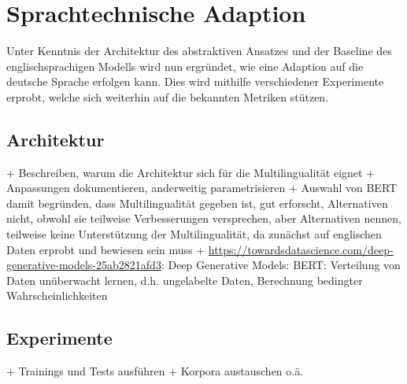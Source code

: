 \chapter{Sprachtechnische Adaption}
\thispagestyle{fancy}
\label{chap:Sprachtechnische Adaption}

\noindent
Unter Kenntnis der Architektur des abstraktiven Ansatzes und der Baseline des englischsprachigen Modells wird nun ergründet, wie eine Adaption auf die deutsche Sprache erfolgen kann. Dies wird mithilfe verschiedener Experimente erprobt, welche sich weiterhin auf die bekannten Metriken stützen.\\


\section{Architektur}
\noindent
+ Beschreiben, warum die Architektur sich für die Multilingualität eignet
+ Anpassungen dokumentieren, anderweitig parametrisieren
+ Auswahl von BERT damit begründen, dass Multilingualität gegeben ist, gut erforscht, Alternativen nicht, obwohl sie teilweise Verbesserungen versprechen, aber Alternativen nennen, teilweise keine Unterstützung der Multilingualität, da zunächst auf englischen Daten erprobt und bewiesen sein muss
+ \url{https://towardsdatascience.com/deep-generative-models-25ab2821afd3}: Deep Generative Models: BERT: Verteilung von Daten unüberwacht lernen, d.h. ungelabelte Daten, Berechnung bedingter Wahrscheinlichkeiten\\


\section{Experimente}
\noindent
+ Trainings und Tests ausführen
+ Korpora austauschen o.ä.\\

